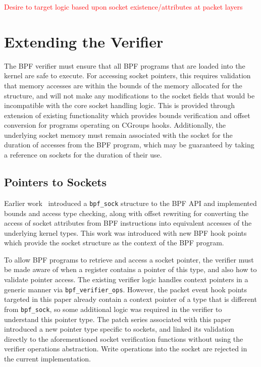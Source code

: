 \documentclass[10pt,sigconf,authorversion]{lpc}
\newcommand\todo[1]{\textcolor{red}{#1}}
\begin{document}
\todo{Desire to target logic based upon socket existence/attributes at packet
layers}

\section{Extending the Verifier}


The BPF verifier must ensure that all BPF programs that are loaded into the
kernel are safe to execute. For accessing socket pointers, this requires
validation that memory accesses are within the bounds of the memory allocated
for the structure, and will not make any modifications to the socket fields
that would be incompatible with the core socket handling logic. This is
provided through extension of existing functionality which provides bounds
verification and offset conversion for programs operating on CGroups hooks.
Additionally, the underlying socket memory must remain associated with the
socket for the duration of accesses from the BPF program, which may be
guaranteed by taking a reference on sockets for the duration of their use.

\subsection{Pointers to Sockets}

Earlier work~\cite{bpf-sock} introduced a \verb+bpf_sock+ structure to the BPF
API and implemented bounds and access type checking, along with offset
rewriting for converting the access of socket attributes from BPF instructions
into equivalent accesses of the underlying kernel types. This work was
introduced with new BPF hook points which provide the socket structure as the
context of the BPF program.

To allow BPF programs to retrieve and access a socket pointer, the verifier
must be made aware of when a register contains a pointer of this type, and also
how to validate pointer access. The existing verifier logic handles context
pointers in a generic manner via \verb+bpf_verifier_ops+. However, the packet
event hook points targeted in this paper already contain a context pointer of a
type that is different from \verb+bpf_sock+, so some additional logic was
required in the verifier to understand this pointer type. The patch series
associated with this paper introduced a new pointer type specific to sockets,
and linked its validation directly to the aforementioned socket verification
functions without using the verifier operations abstraction. Write operations
into the socket are rejected in the current implementation.
\end{document}
